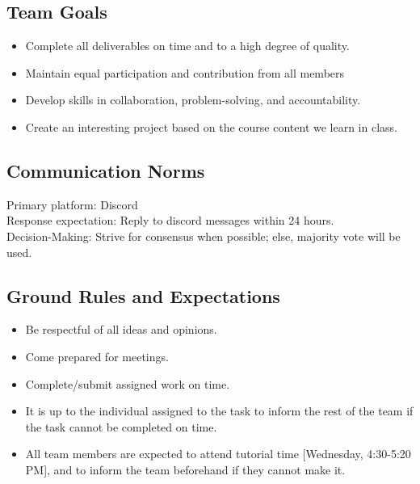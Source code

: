 \documentclass[11pt]{article}
\begin{document}
\subsection{Team Goals}
  \begin{itemize}
    \item Complete all deliverables on time and to a high degree of quality.
    \item Maintain equal participation and contribution from all members
    \item Develop skills in collaboration, problem-solving, and accountability.
    \item Create an interesting project based on the course content we learn in class.
  \end{itemize}
\subsection{Communication Norms}
Primary platform: Discord \\
Response expectation: Reply to discord messages within 24 hours.\\
Decision-Making: Strive for consensus when possible; else, majority vote will be used.\\
\subsection{Ground Rules and Expectations}
  \begin{itemize}
    \item Be respectful of all ideas and opinions.
    \item Come prepared for meetings.
    \item Complete/submit assigned work on time.
    \item It is up to the individual assigned to the task to inform the rest of the team if the task cannot be completed on time.
    \item All team members are expected to attend tutorial time [Wednesday, 4:30-5:20 PM], and to inform the team beforehand if they cannot make it.
  \end{itemize}
\end{document}
